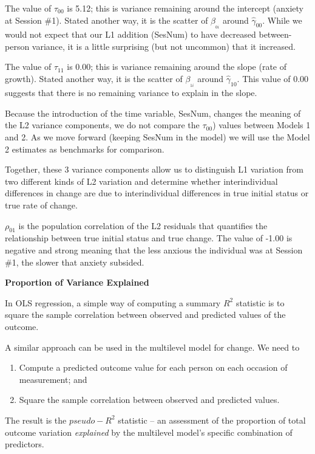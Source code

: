 \documentclass[
  english,
]{book}
\providecommand{\tightlist}{%
  \setlength{\itemsep}{0pt}\setlength{\parskip}{0pt}}
\begin{document}
The value of \(\tau _{00}\) is 5.12; this is variance remaining around the intercept (anxiety at Session \#1). Stated another way, it is the scatter of \(\beta _{_{0i}}\) around \(\hat{\gamma }_{00}\). While we would not expect that our L1 addition (SesNum) to have decreased between-person variance, it is a little surprising (but not uncommon) that it increased.

The value of \(\tau _{11}\) is 0.00; this is variance remaining around the slope (rate of growth). Stated another way, it is the scatter of \(\beta _{_{1i}}\) around \(\hat{\gamma }_{10}\). This value of 0.00 suggests that there is no remaining variance to explain in the slope.

Because the introduction of the time variable, SesNum, changes the meaning of the L2 variance components, we do not compare the \(\tau _{00}\)) values between Models 1 and 2. As we move forward (keeping SesNum in the model) we will use the Model 2 estimates as benchmarks for comparison.

Together, these 3 variance components allow us to distinguish L1 variation from two different kinds of L2 variation and determine whether interindividual differences in change are due to interindividual differences in true initial status or true rate of change.

\(\rho_{01}\) is the population correlation of the L2 residuals that quantifies the relationship between true initial status and true change. The value of -1.00 is negative and strong meaning that the less anxious the individual was at Session \#1, the slower that anxiety subsided.

\textbf{Proportion of Variance Explained}

In OLS regression, a simple way of computing a summary \(R^2\) statistic is to square the sample correlation between observed and predicted values of the outcome.

A similar approach can be used in the multilevel model for change. We need to

\begin{enumerate}
\def\labelenumi{\arabic{enumi}.}
\tightlist
\item
  Compute a predicted outcome value for each person on each occasion of measurement; and
\item
  Square the sample correlation between observed and predicted values.
\end{enumerate}

The result is the \(pseudo-R^2\) statistic -- an assessment of the proportion of total outcome variation \emph{explained} by the multilevel model's specific combination of predictors.
\end{document}
